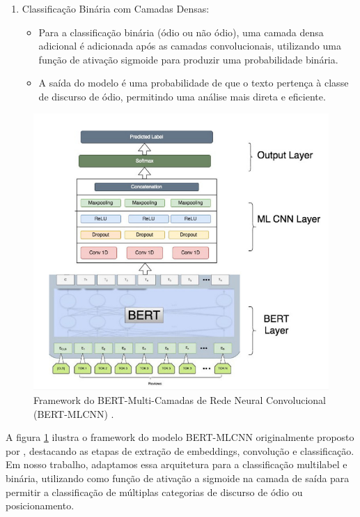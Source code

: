 \documentclass[sigconf,nonacm]{acmart}
\begin{document}
\begin{enumerate}
  \item Classificação Binária com Camadas Densas:
  \begin{itemize}
    \item Para a classificação binária (ódio ou não ódio), uma camada densa adicional é adicionada após as camadas convolucionais, 
    utilizando uma função de ativação sigmoide para produzir uma probabilidade binária.
    \item A saída do modelo é uma probabilidade de que o texto pertença à classe de discurso de ódio, permitindo uma análise mais direta e eficiente.
  \end{itemize}
\end{enumerate}

\begin{figure}[H]
  \centering
  \includegraphics[width=\linewidth]{./resources/framework.png}
  \caption{Framework do BERT-Multi-Camadas de Rede Neural Convolucional (BERT-MLCNN) \cite{ATANDOH2023101578}.}
  \label{fig:framework}
\end{figure}

A figura \ref{fig:framework} ilustra o framework do modelo BERT-MLCNN originalmente proposto por \cite{ATANDOH2023101578}, 
destacando as etapas de extração de embeddings, convolução e classificação.
Em nosso trabalho, adaptamos essa arquitetura para a classificação multilabel e binária, utilizando como função de ativação a sigmoide 
na camada de saída para permitir a classificação de múltiplas categorias de discurso de ódio ou posicionamento.
\end{document}
